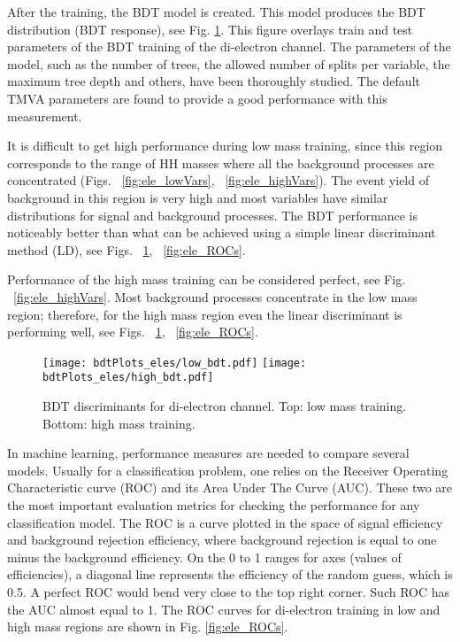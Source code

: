 After the training, the BDT model is created. This model produces the BDT distribution (BDT response), see Fig. \ref{fig:ele_BDTs}. This figure overlays train and test parameters of the BDT training of the di-electron channel. The parameters of the model, such as the number of trees, the allowed number of splits per variable, the maximum tree depth and others, have been thoroughly studied. The default TMVA parameters are found to provide a good performance with this measurement. 

It is difficult to get high performance during low mass training, since
this region corresponds to the range of HH masses where all the background processes are concentrated (Figs. ~\ref{fig:ele_lowVars}, ~\ref{fig:ele_highVars}). The event yield of background in this region is very high and most variables have similar distributions for signal and background processes. The BDT performance is noticeably better than what can be achieved using a simple linear discriminant method (LD), see Figs. ~\ref{fig:ele_BDTs}, ~\ref{fig:ele_ROCs}.

Performance of the high mass training can be considered perfect, see Fig. ~\ref{fig:ele_highVars}. Most background processes concentrate in the low mass region; therefore, for the high mass region even the linear
discriminant is performing well, see Figs. ~\ref{fig:ele_BDTs}, ~\ref{fig:ele_ROCs}.

\begin{figure}[H]
\begin{center}
\texttt{[image: bdtPlots\_eles/low\_bdt.pdf]}
\texttt{[image: bdtPlots\_eles/high\_bdt.pdf]}
\caption[BDT discriminants for di-electron channel.]{ BDT discriminants for di-electron channel. Top: low mass training. Bottom: high mass training. }
\label{fig:ele_BDTs}
\end{center}
\end{figure}

In machine learning, performance measures are needed to compare several models. Usually for a classification problem, one relies on the Receiver Operating Characteristic curve (ROC) and its Area Under The Curve (AUC). These two are the most important evaluation metrics for checking the performance for any classification model. The ROC is a curve plotted in the space of signal efficiency and background rejection efficiency, where background rejection is equal to one minus the background efficiency. On the 0 to 1 ranges for axes (values of efficiencies), a diagonal line represents the efficiency of the random guess, which is 0.5. A perfect ROC would bend very close to the top right corner. Such ROC has the AUC almost equal to 1. The ROC curves for di-electron training in low and high mass regions are shown in Fig. \ref{fig:ele_ROCs}. 

